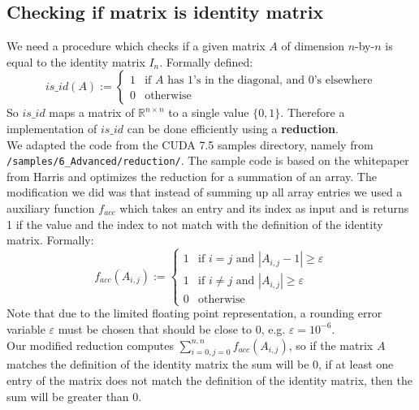\subsection*{Checking if matrix is identity matrix}
We need a procedure which checks if a given matrix $A$ of dimension $n$-by-$n$ is equal to the identity matrix $I_n$. Formally defined:
\begin{equation*}
is\_id(A) := \begin{cases}
1 & \text{if } A \text{ has 1's in the diagonal, and 0's elsewhere}\\
0 & \text{otherwise}
\end{cases}
\end{equation*}
So $is\_id$ maps a matrix of $\mathbb{R}^{n \times n}$ to a single value $\{0,1 \}$. Therefore a implementation of $is\_id$ can be done efficiently using a \textbf{reduction}.  \\
We adapted the code from the CUDA 7.5 samples directory, namely from \texttt{/samples/6\_Advanced/reduction/}. The sample code is based on the whitepaper from Harris \cite{Harris2010} and optimizes the reduction for a summation of an array. The modification we did was that instead of summing up all array entries we used a auxiliary function $f_{acc}$ which takes an entry and its index as input and is returns 1 if  the value and the index to not match with the definition of the identity matrix. Formally:
\begin{equation}
f_{acc}(A_{i,j}) := \begin{cases} 1 & \text{if }i = j \text{ and } |A_{i,j}-1| \geq \varepsilon\\
1 & \text{if } i \neq j \text{ and } |A_{i,j}| \geq \varepsilon\\
0 & \text{otherwise}	\end{cases}
\end{equation}
Note that due to the limited floating point representation, a rounding error variable $\varepsilon$ must be chosen that should be close to 0, e.g. $\varepsilon = 10^{-6}$. \\
Our modified reduction computes $\sum_{i=0,j=0}^{n,n} f_{acc}(A_{i,j})$, so if the matrix $A$ matches the definition of the identity matrix the sum will be 0, if at least one entry of the matrix does not match the definition of the identity matrix, then the sum will be greater than 0.